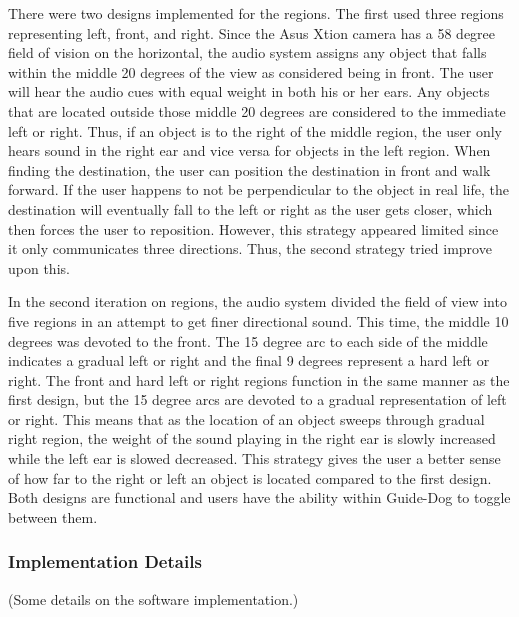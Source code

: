 There were two designs implemented for the regions. The first used three regions
representing left, front, and right. Since the Asus Xtion camera has a 58 degree
field of vision on the horizontal, the audio system assigns any object that
falls within the middle 20 degrees of the view as considered being in front. The
user will hear the audio cues with equal weight in both his or her ears. Any
objects that are located outside those middle 20 degrees are considered to the
immediate left or right. Thus, if an object is to the right of the middle region,
the user only hears sound in the right ear and vice versa for objects in the
left region. When finding the destination, the user can position the destination
in front and walk forward. If the user happens to not be perpendicular to the
object in real life, the destination will eventually fall to the left or right
as the user gets closer, which then forces the user to reposition. However, this
strategy appeared limited since it only communicates three directions. Thus, the
second strategy tried improve upon this.

In the second iteration on regions, the audio system divided the field of view
into five regions in an attempt to get finer directional sound. This time, the
middle 10 degrees was devoted to the front. The 15 degree arc to each side of 
the middle indicates a gradual left or right and the final 9 degrees represent
a hard left or right. The front and hard left or right regions function in the 
same manner as the first design, but the 15 degree arcs are devoted to a gradual
representation of left or right. This means that as the location of an object
sweeps through gradual right region, the weight of the sound playing in the
right ear is slowly increased while the left ear is slowed decreased. This 
strategy gives the user a better sense of how far to the right or left an object
is located compared to the first design. Both designs are functional and users
have the ability within Guide-Dog to toggle between them.

\subsubsection{Implementation Details}
\label{sec:technical-audio-impl}

(Some details on the software implementation.)

